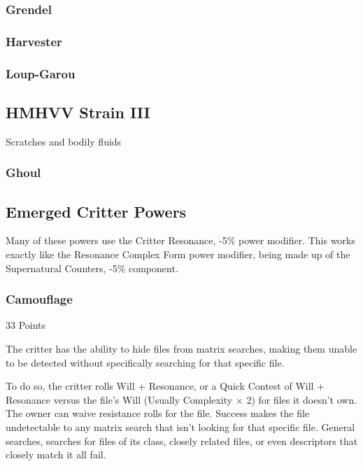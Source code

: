 \begin{multicols*}{3}
	\subsubsection{Grendel}\label{grendel}
	
	\subsubsection{Harvester}\label{harvester}
	
	\subsubsection{Loup-Garou}\label{loup-garou}
	
	\subsection*{HMHVV Strain III}
	
	Scratches and bodily fluids
	
	\subsubsection{Ghoul}\label{ghoul}
	
	\subsection{Emerged Critter Powers}
	
	Many of these powers use the Critter Resonance, -5\% power modifier. This works exactly like the Resonance Complex Form power modifier, being made up of the Supernatural Counters, -5\% component.
	
	\subsubsection{Camouflage}\label{camouflage}
	\begin{flushright}
		33 Points
	\end{flushright}

	The critter has the ability to hide files from matrix searches, making them unable to be detected without specifically searching for that specific file.
	
	To do so, the critter rolls Will + Resonance, or a Quick Contest of Will + Resonance versus the file's Will (Usually Complexity $\times$ 2) for files it doesn't own. The owner can waive resistance rolls for the file. Success makes the file undetectable to any matrix search that isn't looking for that specific file. General searches, searches for files of its class, closely related files, or even descriptors that closely match it all fail.
	

\end{multicols*}

